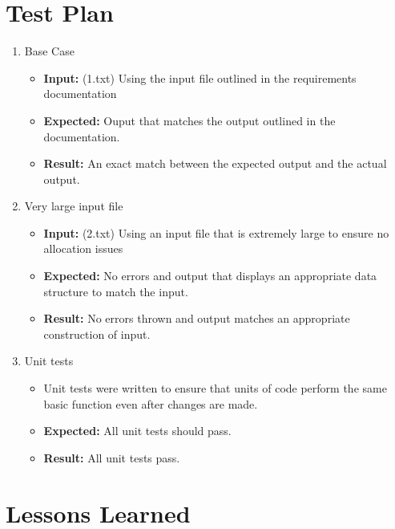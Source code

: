 \documentclass[english,floatsintext,man]{apa6}
\providecommand{\tightlist}{%
  \setlength{\itemsep}{0pt}\setlength{\parskip}{0pt}}
\begin{document}
\section{Test Plan}\label{test-plan}

\begin{enumerate}
\def\labelenumi{\arabic{enumi}.}
\tightlist
\item
  Base Case

  \begin{itemize}
  \tightlist
  \item
    \textbf{Input:} (1.txt) Using the input file outlined in the
    requirements documentation
  \item
    \textbf{Expected:} Ouput that matches the output outlined in the
    documentation.
  \item
    \textbf{Result:} An exact match between the expected output and the
    actual output.
  \end{itemize}
\item
  Very large input file

  \begin{itemize}
  \tightlist
  \item
    \textbf{Input:} (2.txt) Using an input file that is extremely large
    to ensure no allocation issues
  \item
    \textbf{Expected:} No errors and output that displays an appropriate
    data structure to match the input.
  \item
    \textbf{Result:} No errors thrown and output matches an appropriate
    construction of input.
  \end{itemize}
\item
  Unit tests

  \begin{itemize}
  \tightlist
  \item
    Unit tests were written to ensure that units of code perform the
    same basic function even after changes are made.
  \item
    \textbf{Expected:} All unit tests should pass.
  \item
    \textbf{Result:} All unit tests pass.
  \end{itemize}
\end{enumerate}

\section{Lessons Learned}\label{lessons-learned}
\end{document}
